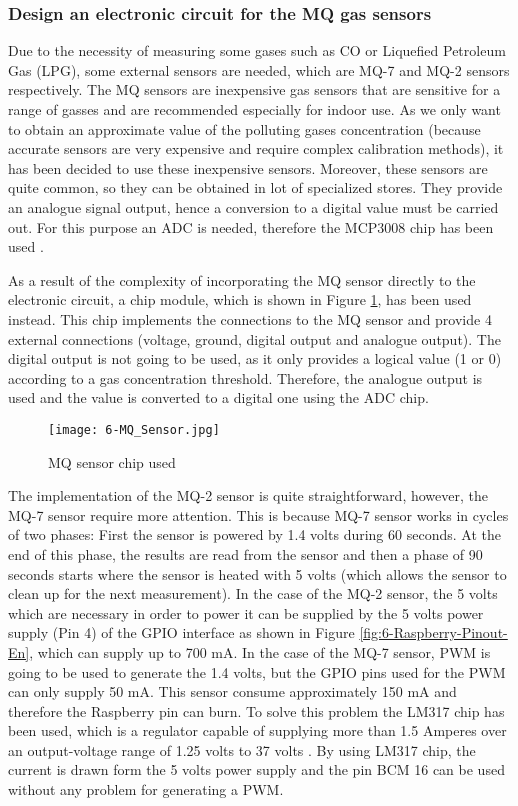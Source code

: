 \subsubsection{Design an electronic circuit for the MQ gas sensors}
Due to the necessity of measuring some gases such as CO or Liquefied Petroleum Gas (LPG), some external sensors are needed, which are MQ-7 and MQ-2 sensors respectively. The MQ sensors are inexpensive gas sensors that are sensitive for a range of gasses and are recommended especially for indoor use. As we only want to obtain an approximate value of the polluting gases concentration (because accurate sensors are very expensive and require complex calibration methods), it has been decided to use these inexpensive sensors. Moreover, these sensors are quite common, so they can be obtained in lot of specialized stores. They provide an analogue signal output, hence a conversion to a digital value must be carried out. For this purpose an \ac{ADC} is needed, therefore the MCP3008 chip has been used \cite{MCP3008}.

As a result of the complexity of incorporating the MQ sensor directly to the electronic circuit, a chip module, which is shown in Figure \ref{fig:6-MQ_Sensor}, has been used instead. This chip implements the connections to the MQ sensor and provide 4 external connections (voltage, ground, digital output and analogue output). The digital output is not going to be used, as it only provides a logical value (1 or 0) according to a gas concentration threshold. Therefore, the analogue output is used and the value is converted to a digital one using the \ac{ADC} chip.

\begin{figure}[!h]
	\begin{center}
		\texttt{[image: 6-MQ\_Sensor.jpg]}
		\caption{MQ sensor chip used}
		\label{fig:6-MQ_Sensor}
	\end{center}
\end{figure}

The implementation of the MQ-2 sensor is quite straightforward, however, the MQ-7 sensor require more attention. This is because MQ-7 sensor works in cycles of two phases: First the sensor is powered by 1.4 volts during 60 seconds. At the end of this phase, the results are read from the sensor and then a phase of 90 seconds starts where the sensor is heated with 5 volts (which allows the sensor to clean up for the next measurement). In the case of the MQ-2 sensor, the 5 volts which are necessary in order to power it can be supplied by the 5 volts power supply (Pin 4) of the GPIO interface as shown in Figure \ref{fig:6-Raspberry-Pinout-En}, which can supply up to 700 mA. In the case of the MQ-7 sensor, \ac{PWM} is going to be used to generate the 1.4 volts, but the GPIO pins used for the \ac{PWM} can only supply 50 mA. This sensor consume approximately 150 mA and therefore the Raspberry pin can burn. To solve this problem the LM317 chip has been used, which is a regulator capable of supplying more than 1.5 Amperes over an output-voltage range of 1.25 volts to 37 volts \cite{LM317}. By using LM317 chip, the current is drawn form the 5 volts power supply and the pin BCM 16 can be used without any problem for generating a \ac{PWM}.

